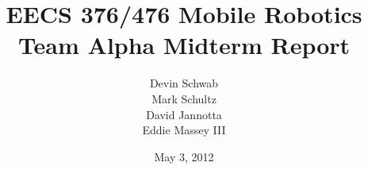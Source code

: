 \documentclass[10pt,letterpaper,draft]{report}
\author{Devin Schwab\\
  Mark Schultz\\
  David Jannotta\\
  Eddie Massey III}
\title{EECS 376/476 Mobile Robotics\\
  Team Alpha Midterm Report} \date{May 3, 2012}
\begin{document}

\listoftodos
\maketitle

\tableofcontents
\newpage












\end{document}
